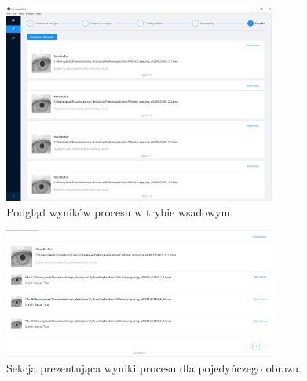 \begin{figure}[ht]
  \centering
  \includegraphics[width=0.8\textwidth]{images/app/batchResults.png}
  \caption{Podgląd wyników procesu w trybie wsadowym.}
  \label{fig:batchResults}
\end{figure}

\begin{figure}[ht]
  \centering
  \includegraphics[width=0.8\textwidth]{images/app/batchSingleResult.png}
  \caption{Sekcja prezentująca wyniki procesu dla pojedyńczego obrazu.}
  \label{fig:batchSingleEntryResult}
\end{figure}
